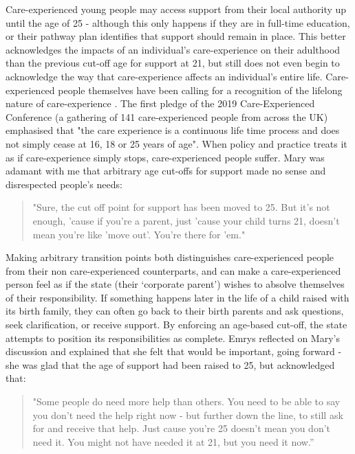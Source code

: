 Care-experienced young people may access support from their local authority up until the age of 25 - although this only happens if they are in full-time education, or their pathway plan identifies that support should remain in place.  This better acknowledges the impacts of an individual’s care-experience on their adulthood than the previous cut-off age for support at 21, but still does not even begin to acknowledge the way that care-experience affects an individual's entire life.  Care-experienced people themselves have been calling for a recognition of the lifelong nature of care-experience \citep{the_care_experienced_conference_care_2019}. The first pledge of the 2019 Care-Experienced Conference (a gathering of 141 care-experienced people from across the UK) emphasised that "the care experience is a continuous life time process and does not simply cease at 16, 18 or 25 years of age". When policy and practice treats it as if care-experience simply stops, care-experienced people suffer. Mary was adamant with me that arbitrary age cut-offs for support made no sense and disrespected people's needs:
\begin{quote}
"Sure, the cut off point for support has been moved to 25. But it's not enough, 'cause if you're a parent, just 'cause your child turns 21, doesn't mean you're like 'move out'. You're there for 'em."
\end{quote}
Making arbitrary transition points both distinguishes care-experienced people from their non care-experienced counterparts, and can make a care-experienced person feel as if the state (their ‘corporate parent’) wishes to absolve themselves of their responsibility. If something happens later in the life of a child raised with its birth family, they can often go back to their birth parents and ask questions, seek clarification, or receive support. By enforcing an age-based cut-off, the state attempts to position its responsibilities as complete. Emrys reflected on Mary's discussion and explained that she felt that would be important, going forward - she was glad that the age of support had been raised to 25, but acknowledged that:
\begin{quote}
"Some people do need more help than others. You need to be able to say you don't need the help right now - but further down the line, to still ask for and receive that help. Just cause you're 25 doesn't mean you don't need it. You might not have needed it at 21, but you need it now.”
\end{quote}
